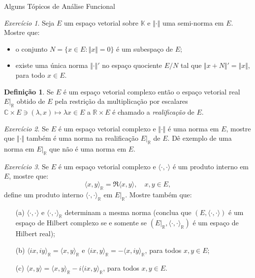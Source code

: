 \documentclass[oneside,final,11pt]{amsbook}
\newcommand{\R}{\mathds R}
\newcommand{\C}{\mathds C}
\newcommand{\K}{\mathds K}
\theoremstyle{remark}\newtheorem{exercise}{Exercício}[chapter]
\theoremstyle{remark}\newtheorem{*exercise}[exercise]{\hbox to 0pt{\hskip 0pt minus 1fil*}Exercício}
\theoremstyle{definition}\newtheorem{exdefin}{Definição}[chapter]
\theoremstyle{plain}\newtheorem{teo}{Teorema}[section]
\theoremstyle{plain}\newtheorem{lem}[teo]{Lema}
\theoremstyle{plain}\newtheorem{prop}[teo]{Proposição}
\theoremstyle{plain}\newtheorem{cor}[teo]{Corolário}
\theoremstyle{definition}\newtheorem{defin}[teo]{Definição}
\theoremstyle{remark}\newtheorem{rem}[teo]{Observação}
\theoremstyle{definition}\newtheorem{notation}[teo]{Notação}
\theoremstyle{definition}\newtheorem{convention}[teo]{Convenção}
\theoremstyle{definition}\newtheorem{example}[teo]{Exemplo}
\numberwithin{section}{chapter}
\numberwithin{equation}{section}
\begin{document}
\begin{chapter}{Alguns Tópicos de Análise Funcional}
\begin{exercise}\label{exe:seminormaviranorma}
Seja $E$ um espaço vetorial sobre $\K$ e $\Vert\cdot\Vert$ uma semi-norma em $E$. Mostre que:
\begin{itemize}
\item o conjunto $N=\big\{x\in E:\Vert x\Vert=0\big\}$ é um subespaço de $E$;
\item existe uma única norma $\Vert\cdot\Vert'$ no espaço quociente $E/N$ tal que
$\Vert x+N\Vert'=\Vert x\Vert$, para todo $x\in E$.
\end{itemize}
\end{exercise}

\begin{exdefin}\label{thm:realificacao}
Se $E$ é um espaço vetorial complexo então o espaço vetorial real $E\vert_\R$\index[simbolos]{$E\vert_\R$} obtido de $E$ pela restrição
da multiplicação por escalares $\C\times E\ni(\lambda,x)\mapsto\lambda x\in E$ a $\R\times E$ é chamado a
{\em realificação\/} de $E$.
\end{exdefin}

\begin{exercise}\label{exe:mesmanormanareal}
Se $E$ é um espaço vetorial complexo e $\Vert\cdot\Vert$ é uma norma em $E$, mostre que $\Vert\cdot\Vert$ também
é uma norma na realificação $E\vert_\R$ de $E$. Dê exemplo de uma norma em $E\vert_\R$ que não é uma norma em $E$.
\end{exercise}

\begin{exercise}\label{exe:prodintrealifica}
Se $E$ é um espaço vetorial complexo e $\langle\cdot,\cdot\rangle$ é um produto interno em $E$, mostre que:
\[\langle x,y\rangle_\R=\Re\langle x,y\rangle,\quad x,y\in E,\]
define um produto interno $\langle\cdot,\cdot\rangle_\R$ em $E\vert_\R$. Mostre também que:
\begin{itemize}
\item[(a)] $\langle\cdot,\cdot\rangle$ e $\langle\cdot,\cdot\rangle_\R$ determinam a mesma norma
(conclua que $(E,\langle\cdot,\cdot\rangle)$ é um espaço de Hilbert complexo se e somente se
$(E\vert_\R,\langle\cdot,\cdot\rangle_\R)$ é um espaço de Hilbert real);
\item[(b)] $\langle ix,iy\rangle_\R=\langle x,y\rangle_\R$ e $\langle ix,y\rangle_\R=-\langle x,iy\rangle_\R$, para todos $x,y\in E$;
\item[(c)] $\langle x,y\rangle=\langle x,y\rangle_\R-i\langle ix,y\rangle_\R$, para todos $x,y\in E$.
\end{itemize}
\end{exercise}


\end{chapter}
\end{document}
